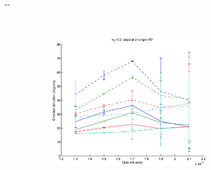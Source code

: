 \documentclass{article}
\begin{document}
\begin{figure}[H]
\begin{adjustwidth}{-\oddsidemargin}{-\rightmargin}
\begin{subfigure}{0.8\paperwidth}
\begin{subfigure}{0.3\textwidth}
      \end{subfigure}
      ~
      \begin{subfigure}{0.3\textwidth}
        \centering
        \includegraphics[width=\textwidth]{figures/synth_modbas_diffus__snr=20__w1=3__angle=90.eps}
      \end{subfigure}
    \end{subfigure}
    

\end{adjustwidth}
\end{figure}
\end{document}
